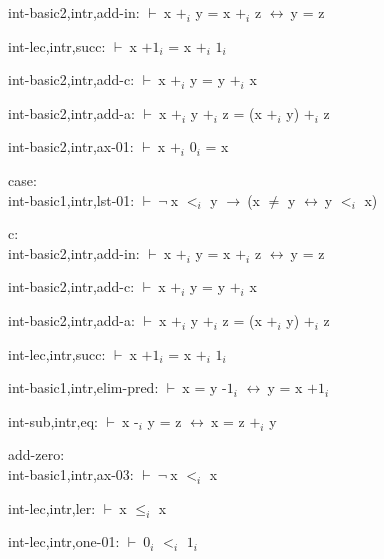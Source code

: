 \documentclass[a4paper]{article}
\newcommand{\Fol}{\mbox{$\vdash\ $}}
\newcommand{\Not}{\mbox{$\neg\ $}}
\newcommand{\Imp}{\mbox{$\rightarrow\ $}}
\newcommand{\Equiv}{\mbox{$\leftrightarrow\ $}}
\begin{document}
int-basic2,intr,add-in: 
 \Fol x $\mbox{+}_{i}$ y = x $\mbox{+}_{i}$ z \Equiv y = z



int-lec,intr,succ: 
 \Fol x $\mbox{+1}_{i}$ = x $\mbox{+}_{i}$ $\mbox{1}_{i}$



int-basic2,intr,add-c: 
 \Fol x $\mbox{+}_{i}$ y = y $\mbox{+}_{i}$ x



int-basic2,intr,add-a: 
 \Fol x $\mbox{+}_{i}$ y $\mbox{+}_{i}$ z = (x $\mbox{+}_{i}$ y) $\mbox{+}_{i}$ z



int-basic2,intr,ax-01: 
 \Fol x $\mbox{+}_{i}$ $\mbox{0}_{i}$ = x



\bigskip

case:\\ int-basic1,intr,lst-01: 
 \Fol \Not x $\mbox{$<$}_{i}$ y \Imp (x $\neq$ y \Equiv y $\mbox{$<$}_{i}$ x)



\bigskip

c:\\ int-basic2,intr,add-in: 
 \Fol x $\mbox{+}_{i}$ y = x $\mbox{+}_{i}$ z \Equiv y = z



int-basic2,intr,add-c: 
 \Fol x $\mbox{+}_{i}$ y = y $\mbox{+}_{i}$ x



int-basic2,intr,add-a: 
 \Fol x $\mbox{+}_{i}$ y $\mbox{+}_{i}$ z = (x $\mbox{+}_{i}$ y) $\mbox{+}_{i}$ z



int-lec,intr,succ: 
 \Fol x $\mbox{+1}_{i}$ = x $\mbox{+}_{i}$ $\mbox{1}_{i}$



int-basic1,intr,elim-pred: 
 \Fol x = y $\mbox{-1}_{i}$ \Equiv y = x $\mbox{+1}_{i}$



int-sub,intr,eq: 
 \Fol x $\mbox{-}_{i}$ y = z \Equiv x = z $\mbox{+}_{i}$ y



\bigskip

add-zero:\\ int-basic1,intr,ax-03: 
 \Fol \Not x $\mbox{$<$}_{i}$ x



int-lec,intr,ler: 
 \Fol x $\mbox{$\le$}_{i}$ x



int-lec,intr,one-01: 
 \Fol $\mbox{0}_{i}$ $\mbox{$<$}_{i}$ $\mbox{1}_{i}$
\end{document}
